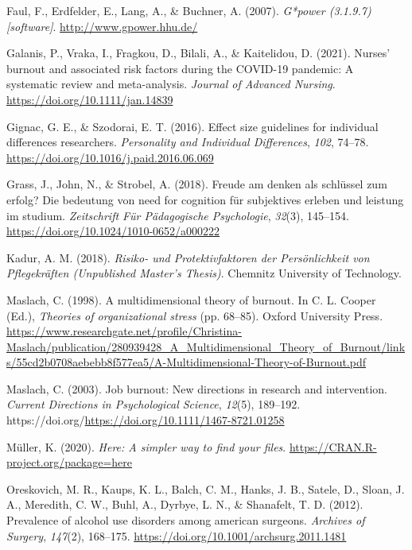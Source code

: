 \documentclass[
  english,
  man]{apa6}
\newlength{\cslhangindent}
\newenvironment{CSLReferences}[2] %
 {\begin{list}{}{%
  \setlength{\itemindent}{0pt}
  \setlength{\leftmargin}{0pt}
  \setlength{\parsep}{0pt}
  \ifodd #1
   \setlength{\leftmargin}{\cslhangindent}
   \setlength{\itemindent}{-1\cslhangindent}
  \fi
  \setlength{\itemsep}{#2\baselineskip}}}
 {\end{list}}
\begin{document}
\begin{CSLReferences}{1}{0}
Faul, F., Erdfelder, E., Lang, A., \& Buchner, A. (2007). \emph{G*power (3.1.9.7) {[}software{]}}. \url{http://www.gpower.hhu.de/}

Galanis, P., Vraka, I., Fragkou, D., Bilali, A., \& Kaitelidou, D. (2021). Nurses' burnout and associated risk factors during the COVID-19 pandemic: A systematic review and meta-analysis. \emph{Journal of Advanced Nursing}. \url{https://doi.org/10.1111/jan.14839}

Gignac, G. E., \& Szodorai, E. T. (2016). Effect size guidelines for individual differences researchers. \emph{Personality and Individual Differences}, \emph{102}, 74--78. \url{https://doi.org/10.1016/j.paid.2016.06.069}

Grass, J., John, N., \& Strobel, A. (2018). Freude am denken als schlüssel zum erfolg? Die bedeutung von need for cognition für subjektives erleben und leistung im studium. \emph{Zeitschrift Für Pädagogische Psychologie}, \emph{32}(3), 145--154. \url{https://doi.org/10.1024/1010-0652/a000222}

Kadur, A. M. (2018). \emph{{Risiko}- und {Protektivfaktoren} der {Persönlichkeit} von {Pflegekräften} ({Unpublished Master's Thesis})}. Chemnitz University of Technology.

Maslach, C. (1998). A multidimensional theory of burnout. In C. L. Cooper (Ed.), \emph{Theories of organizational stress} (pp. 68--85). Oxford University Press. \url{https://www.researchgate.net/profile/Christina-Maslach/publication/280939428_A_Multidimensional_Theory_of_Burnout/links/55cd2b0708aebebb8f577ea5/A-Multidimensional-Theory-of-Burnout.pdf}

Maslach, C. (2003). Job burnout: New directions in research and intervention. \emph{Current Directions in Psychological Science}, \emph{12}(5), 189--192. https://doi.org/\url{https://doi.org/10.1111/1467-8721.01258}

Müller, K. (2020). \emph{Here: A simpler way to find your files}. \url{https://CRAN.R-project.org/package=here}

Oreskovich, M. R., Kaups, K. L., Balch, C. M., Hanks, J. B., Satele, D., Sloan, J. A., Meredith, C. W., Buhl, A., Dyrbye, L. N., \& Shanafelt, T. D. (2012). Prevalence of alcohol use disorders among american surgeons. \emph{Archives of Surgery}, \emph{147}(2), 168--175. \url{https://doi.org/10.1001/archsurg.2011.1481}


\end{CSLReferences}
\end{document}
